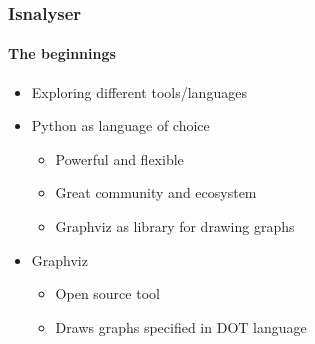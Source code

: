 \documentclass[9pt]{beamer}
\begin{document}
\begin{frame}
\frametitle{Isnalyser}
\framesubtitle{The beginnings}
\begin{itemize}%
	\item Exploring different tools/languages
	\pause
	\item Python as language of choice
	\begin{itemize}
		\item Powerful and flexible
		\item Great community and ecosystem
		\item Graphviz as library for drawing graphs
	\end{itemize}
\pause
	\item Graphviz
	\begin{itemize}
		\item Open source tool
		\item Draws graphs specified in DOT language
	\end{itemize}
\end{itemize}
\end{frame} 
\end{document}
